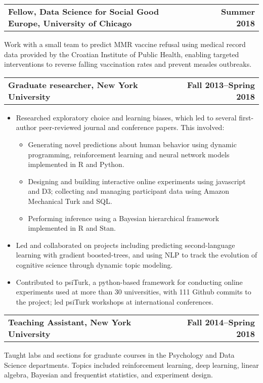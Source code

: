 \documentclass[10pt]{resume}
\begin{document}
\begin{addmargin}[1em]{0em}
\begin{tabular}{@{} L M R}
  \textbf{Fellow, Data Science for Social Good Europe, University of Chicago}& &\textbf{Summer 2018}\\
\end{tabular}\vspace{-1em}
Work with a small team to predict MMR vaccine refusal using medical record data provided by the Croatian
Institute of Public Health, enabling targeted
interventions to reverse falling vaccination rates and prevent measles outbreaks.

\begin{tabular}{@{} L M R}
  \textbf{Graduate researcher, New York University}& &\textbf{Fall 2013--Spring 2018}\\
\end{tabular}\vspace{-1em}
\begin{itemize}[noitemsep,topsep=-10pt,leftmargin=*]
\item Researched exploratory choice and learning biases, which led to several first-author peer-reviewed journal and conference papers. This involved:
  \begin{itemize}[noitemsep,topsep=0pt]
  \item Generating novel predictions about human behavior using dynamic programming,
    reinforcement learning and neural network models implemented in R and Python.
  \item Designing and building interactive online experiments using javascript and D3;
    collecting and managing participant data using Amazon Mechanical Turk and SQL.
  \item Performing inference using a Bayesian hierarchical framework implemented in R and Stan.
  \end{itemize}
\item Led and collaborated on projects including predicting second-language learning
  with gradient boosted-trees, and using NLP to track the evolution of cognitive
  science through dynamic topic modeling.
\item Contributed to psiTurk, a python-based framework for
  conducting online experiments used at more than 30 universities, with 111
  Github commits to the project; led psiTurk workshops at international conferences.\vspace{1em}
\end{itemize}
  

\begin{tabular}{@{} L M R}
  \textbf{Teaching Assistant, New York University}& &\textbf{Fall 2014--Spring 2018}\\
\end{tabular}\vspace{-1em}
  Taught labs and sections for graduate courses in the Psychology and
  Data Science departments. Topics included reinforcement learning, deep learning, linear algebra, Bayesian
  and frequentist statistics, and experiment design.


\end{addmargin}
\end{document}
